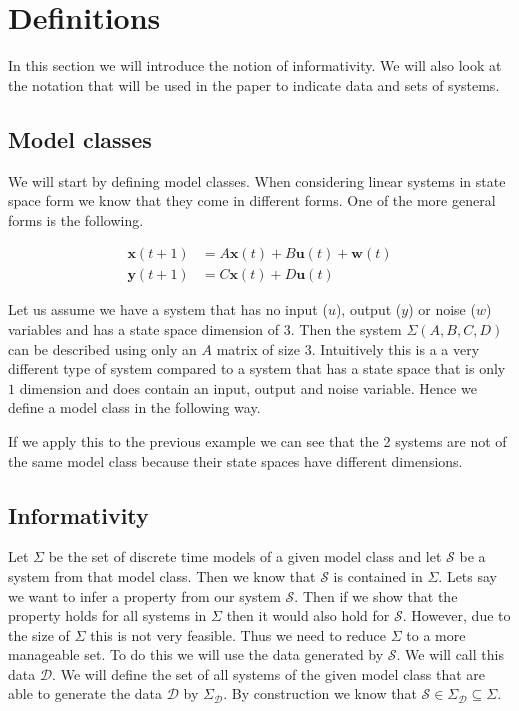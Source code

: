 \section{Definitions}
In this section we will introduce the notion of informativity. We will also look at the notation that will be used in the paper to indicate data and sets of systems. 

\subsection{Model classes}
We will start by defining model classes. When considering linear systems in state space form we know that they come in different forms. One of the more general forms is the following.

\begin{align}
	\mathbf{x}(t+1) &= A \mathbf{x}(t) + B \mathbf{u}(t) + \mathbf{w}(t)\\
	\mathbf{y}(t+1) &= C \mathbf{x}(t) + D \mathbf{u}(t)
\end{align}


Let us assume we have a system that has no input ($u$), output ($y$) or noise ($w$) variables and has a state space dimension of $3$. Then the system $\Sigma(A,B,C,D)$ can be described using only an $A$ matrix of size $3$. Intuitively this is a a very different type of system compared to a system that has a state space that is only $1$ dimension and does contain an input, output and noise variable. Hence we define a model class in the following way.


If we apply this to the previous example we can see that the 2 systems are not of the same model class because their state spaces have different dimensions.

\subsection{Informativity}
Let $\Sigma$ be the set of discrete time models of a given model class and let $\mathcal{S}$ be a system from that model class. Then we know that $\mathcal{S}$ is contained in $\Sigma$. Lets say we want to infer a property from our system $\mathcal{S}$. Then if we show that the property holds for all systems in $\Sigma$ then it would also hold for $\mathcal{S}$. However, due to the size of $\Sigma$ this is not very feasible. Thus we need to reduce $\Sigma$ to a more manageable set. To do this we will use the data generated by $\mathcal{S}$. We will call this data $\mathcal{D}$. We will define the set of all systems of the given model class that are able to generate the data $\mathcal{D}$ by $\Sigma_\mathcal{D}$. By construction we know that $\mathcal{S} \in \Sigma_\mathcal{D} \subseteq \Sigma$.

